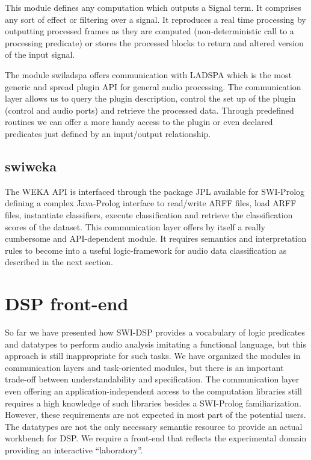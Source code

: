 \documentclass[runningheads]{llncs}
\begin{document}
This module defines any computation which outputs a Signal term. It comprises any sort of effect or filtering over a signal. It reproduces a real time processing by outputting processed frames as they are computed (non-deterministic call to a processing predicate) or stores the processed blocks to return and altered version of the input signal.

The module swiladspa offers communication with LADSPA which is the most generic and spread plugin API for general audio processing. The communication layer allows us to query the plugin description, control the set up of the plugin (control and audio ports) and retrieve the processed data. Through predefined routines we can offer a more handy access to the plugin or even declared predicates just defined by an input/output relationship.

\subsection{swiweka}\label{subsec:swiweka}

The WEKA API is interfaced through the package JPL available for SWI-Prolog defining a complex Java-Prolog interface to read/write ARFF files, load ARFF files, instantiate classifiers, execute classification and retrieve the classification scores of the dataset. This communication layer offers by itself a really cumbersome and API-dependent module. It requires semantics and interpretation rules to become into a useful logic-framework for audio data classification as described in the next section.

\section{DSP front-end}\label{sec:frontend}

So far we have presented how SWI-DSP provides a vocabulary of logic predicates and datatypes to perform audio analysis imitating a functional language, but this approach is still inappropriate for such tasks. We have organized the modules in communication layers and task-oriented modules, but there is an important trade-off between understandability and specification. The communication layer even offering an application-independent access to the computation libraries still requires a high knowledge of such libraries besides a SWI-Prolog familiarization. However, these requirements are not expected in most part of the potential users. The datatypes are not the only necessary semantic resource to provide an actual workbench for DSP. We require a front-end that reflects the experimental domain providing an interactive ``laboratory''.
\end{document}
